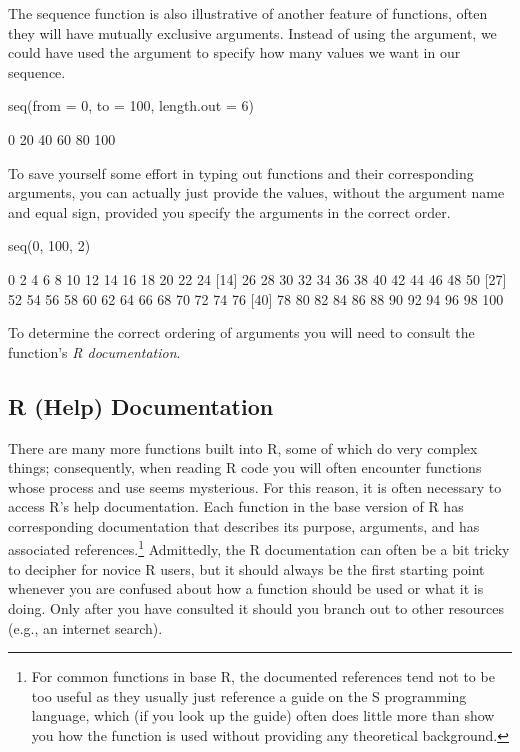 The sequence function is also illustrative of another feature of functions, often they will have mutually exclusive arguments. Instead of using the  argument, we could have used the  argument to specify how many values we want in our sequence.

\begin{inR}
seq(from = 0, to = 100, length.out = 6)
\end{inR}
\begin{outR}
[1]   0  20  40  60  80 100
\end{outR}

To save yourself some effort in typing out functions and their corresponding arguments, you can actually just provide the values, without the argument name and equal sign, provided you specify the arguments in the correct order.

\begin{inR}
seq(0, 100, 2)
\end{inR}
\begin{outR}
 [1]   0   2   4   6   8  10  12  14  16  18  20  22  24
[14]  26  28  30  32  34  36  38  40  42  44  46  48  50
[27]  52  54  56  58  60  62  64  66  68  70  72  74  76
[40]  78  80  82  84  86  88  90  92  94  96  98 100
\end{outR}

\noindent
To determine the correct ordering of arguments you will need to consult the function's \textit{R documentation}.

\subsection{R (Help) Documentation}

There are many more functions built into R, some of which do very complex things; consequently, when reading R code you will often encounter functions whose process and use seems mysterious.  For this reason, it is often necessary to access R's help documentation. Each function in the base version of R has corresponding documentation that describes its purpose, arguments, and has associated references.\footnote{For common functions in base R, the documented references tend not to be too useful as they usually just reference a guide on the S programming language, which (if you look up the guide) often does little more than show you how the function is used without providing any theoretical background.} Admittedly, the R documentation can often be a bit tricky to decipher for novice R users, but it should always be the first starting point whenever you are confused about how a function should be used or what it is doing.  Only after you have consulted it should you branch out to other resources (e.g., an internet search).

